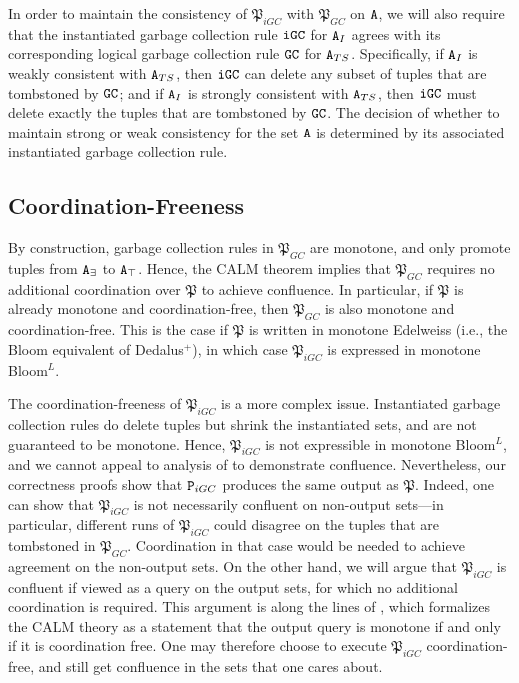 In order to maintain the consistency of $\mathfrak{P}_{iGC}$ with $\mathfrak{P}_{GC}$ on $\tt{A}$, we will also require that the instantiated garbage collection rule $\tt{iGC}$ for $\tt{A}_I$ agrees with its corresponding logical garbage collection rule $\tt{GC}$ for $\tt{A}_{TS}$.
Specifically, if $\tt{A}_I$ is weakly consistent with $\tt{A}_{TS}$, then $\tt{iGC}$ can delete any subset of tuples that are tombstoned by $\tt{GC}$; and if $\tt{A}_I$ is strongly consistent with $\tt{A}_{TS}$, then $\tt{iGC}$ must delete exactly the tuples that are tombstoned by $\tt{GC}$.
The decision of whether to maintain strong or weak consistency for the set $\tt{A}$ is determined by its associated instantiated garbage collection rule. 

\subsection{Coordination-Freeness}
By construction, garbage collection rules in $\mathfrak{P}_{GC}$ are monotone, and only promote tuples from $\tt{A}_\exists$ to $\tt{A}_\top$.
Hence, the CALM theorem implies that $\mathfrak{P}_{GC}$ requires no additional coordination over $\mathfrak{P}$ to achieve confluence.
In particular, if $\mathfrak{P}$ is already monotone and coordination-free, then $\mathfrak{P}_{GC}$ is also monotone and coordination-free.
This is the case if $\mathfrak{P}$ is written in monotone Edelweiss (i.e., the Bloom equivalent of Dedalus$^+$), in which case $\mathfrak{P}_{iGC}$ is expressed in monotone Bloom$^L$.

The coordination-freeness of $\mathfrak{P}_{iGC}$ is a more complex issue.
Instantiated garbage collection rules do delete tuples but  shrink the instantiated sets, and are not guaranteed to be monotone.
Hence, $\mathfrak{P}_{iGC}$ is not expressible in monotone Bloom$^L$, and we cannot appeal to analysis of \cite{marczak2012confluence} to demonstrate confluence.
Nevertheless, our correctness proofs show that $\tt{P}_{iGC}$ produces the same output as $\mathfrak{P}$.
Indeed, one can show that $\mathfrak{P}_{iGC}$ is not necessarily confluent on non-output sets---in particular, different runs of $\mathfrak{P}_{iGC}$ could disagree on the tuples that are tombstoned in $\mathfrak{P}_{GC}$.
Coordination in that case would be needed to achieve agreement on the non-output sets.
On the other hand, we will argue that $\mathfrak{P}_{iGC}$ is confluent if viewed as a query on the output sets, for which no additional coordination is required.
This argument is along the lines of \cite{ameloot2013relational}, which formalizes the CALM theory as a statement that the output query is monotone if and only if it is coordination free.
One may therefore choose to execute $\mathfrak{P}_{iGC}$ coordination-free, and still get confluence in the sets that one cares about.


